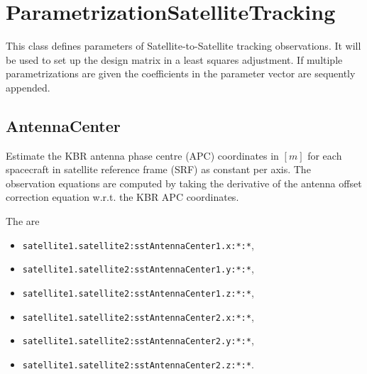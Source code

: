 \clearpage

\section{ParametrizationSatelliteTracking}\label{parametrizationSatelliteTrackingType}
This class defines parameters of Satellite-to-Satellite tracking observations.
It will be used to set up the design matrix in a least squares adjustment.
If multiple parametrizations are given the coefficients in the parameter vector
are sequently appended.


\subsection{AntennaCenter}\label{parametrizationSatelliteTrackingType:antennaCenter}
Estimate the KBR antenna phase centre (APC) coordinates in $[m]$ for each spacecraft in satellite reference frame (SRF)
as constant per axis. The observation equations are computed by taking the derivative
of the antenna offset correction equation w.r.t. the KBR APC coordinates.

The  are
\begin{itemize}
\item \verb|satellite1.satellite2:sstAntennaCenter1.x:*:*|,
\item \verb|satellite1.satellite2:sstAntennaCenter1.y:*:*|,
\item \verb|satellite1.satellite2:sstAntennaCenter1.z:*:*|,
\item \verb|satellite1.satellite2:sstAntennaCenter2.x:*:*|,
\item \verb|satellite1.satellite2:sstAntennaCenter2.y:*:*|,
\item \verb|satellite1.satellite2:sstAntennaCenter2.z:*:*|.
\end{itemize}


